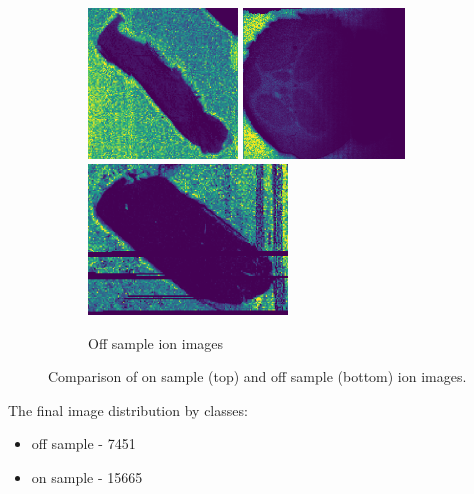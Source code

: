 \documentclass[a4paper]{article}
\begin{document}
\begin{figure}[H]
        \begin{subfigure}[b]{\textwidth}
            \centering
            \includegraphics[width=\textwidth,height=4cm,keepaspectratio]{off_sample_1.png}
            \includegraphics[width=\textwidth,height=4cm,keepaspectratio]{off_sample_2.png}
            \includegraphics[width=\textwidth,height=4cm,keepaspectratio]{off_sample_3.png}
            \caption{Off sample ion images}
        \end{subfigure}
        \caption{Comparison of on sample (top) and off sample (bottom) ion images.}
    \end{figure}
    
    The final image distribution by classes:
    
    \begin{itemize}
        \item off sample - 7451
        \item on sample - 15665
    \end{itemize}
    
\end{document}
